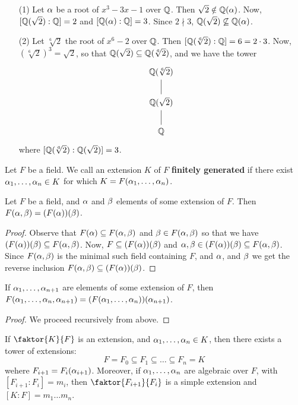 \begin{example}\label{example_8.7}
  \begin{enumerate}
    \item[(1)] Let $\alpha$ be a root of $x^3-3x-1$ over $\mathbb{Q}$. Then
      $\sqrt{2} \notin \mathbb{Q}(\alpha)$. Now, $[\mathbb{Q}(\sqrt{2}):\mathbb{Q}]=2$
      and $[\mathbb{Q}(\alpha):\mathbb{Q}]=3$. Since $2 \nmid 3$, $\mathbb{Q}(\sqrt{2})
      \not\subseteq \mathbb{Q}(\alpha)$.

    \item[(2)] Let $\sqrt[6]{2}$ the root of $x^6-2$ over $\mathbb{Q}$. Then
      $[\mathbb{Q}(\sqrt[6]{2}):\mathbb{Q}]=6=2 \cdot 3$. Now,
      $(\sqrt[6]{2})^3=\sqrt{2}$, so that $\mathbb{Q}(\sqrt{2}) \subseteq
      \mathbb{Q}(\sqrt[6]{2})$, and we have the tower
      \[\begin{tikzcd}
        {\Q(\sqrt[6]{2})} \\
        {\Q(\sqrt{2})} \\
        \Q
        \arrow[no head, from=2-1, to=1-1]
        \arrow[no head, from=3-1, to=2-1]
      \end{tikzcd}\]
      where $[\mathbb{Q}(\sqrt[6]{2}):\mathbb{Q}(\sqrt{2})]=3$.
  \end{enumerate}
\end{example}

\begin{definition}
  Let $F$ be a field. We call an extension $K$ of $F$
  \textbf{finitely generated} if there exist $\alpha_1, \dots, \alpha_n \in K$
  for which $K=F(\alpha_1, \dots, \alpha_n)$.
\end{definition}

\begin{lemma}\label{lemma_8.2.6}
  Let $F$ be a field, and $\alpha$ and $\beta$ elements of some extension of
  $F$. Then $F(\alpha,\beta)=(F(\alpha))(\beta)$.
\end{lemma}
\begin{proof}
  Observe that $F(\alpha) \subseteq F(\alpha,\beta)$ and $\beta \in F(\alpha,\beta)$ so
  that we have $(F(\alpha))(\beta) \subseteq F(\alpha,\beta)$. Now, $F \subseteq
  (F(\alpha))(\beta)$ and $\alpha,\beta \in (F(\alpha))(\beta) \subseteq F(\alpha,\beta)$. Since
  $F(\alpha,\beta)$ is the minimal such field containing $F$, and $\alpha$, and
  $\beta$ we get the reverse inclusion  $F(\alpha,\beta) \subseteq (F(\alpha))(\beta)$.
\end{proof}
\begin{corollary}
  If $\alpha_1, \dots, \alpha_{n+1}$ are elements of some extension of $F$,
  then $F(\alpha_1, \dots, \alpha_n, \alpha_{n+1})=(F(\alpha_1, \dots,
  \alpha_n))(\alpha_{n+1})$.
\end{corollary}
\begin{proof}
  We proceed recursively from above.
\end{proof}
\begin{corollary}
  If $\faktor{K}{F}$ is an extension, and $\alpha_1, \dots, \alpha_n \in K$,
  then there exists a tower of extensions:
  \begin{equation*}
    F=F_0 \subseteq F_1 \subseteq \dots \subseteq F_n=K
  \end{equation*}
  wehere $F_{i+1}=F_i(\alpha_{i+1})$. Moreover, if $\alpha_1, \dots, \alpha_n$ are
  algebraic over $F$, with $[F_{i+1}:F_i]=m_i$, then
  $\faktor{F_{i+1}}{F_i}$ is a simple extension and $[K:F]=m_1 \dots
  m_n$.
\end{corollary}

